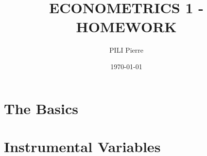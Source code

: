 \documentclass[12pt]{article}
\title{ECONOMETRICS 1 - HOMEWORK}
\author{PILI Pierre}
\date{\today}
\begin{document}
\maketitle

\section{The Basics}


\newpage
{}
\section{Instrumental Variables}

\end{document}
